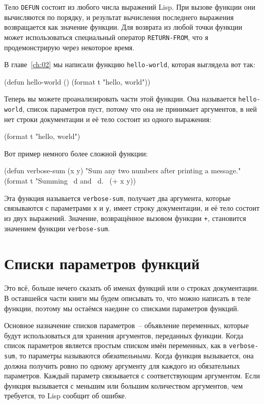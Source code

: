 Тело \lstinline{DEFUN} состоит из любого числа выражений Lisp.  При вызове функции они
вычисляются по порядку, и результат вычисления последнего выражения возвращается как
значение функции.  Для возврата из любой точки функции может использоваться специальный
оператор \lstinline{RETURN-FROM}, что я продемонстрирую через некоторое время.

В главе~\ref{ch:02} мы написали функцию \lstinline{hello-world}, которая выглядела вот так:

\begin{myverb}
(defun hello-world () (format t "hello, world"))
\end{myverb}

Теперь вы можете проанализировать части этой функции.  Она называется \lstinline{hello-world},
список параметров пуст, потому что она не принимает аргументов, в ней нет строки
документации и её тело состоит из одного выражения:

\begin{myverb}
(format t "hello, world")
\end{myverb}

Вот пример немного более сложной функции:

\begin{myverb}
(defun verbose-sum (x y)
  "Sum any two numbers after printing a message."
  (format t "Summing ~d and ~d.~%
  (+ x y))
\end{myverb}

Эта функция называется \lstinline{verbose-sum}, получает два аргумента, которые связываются с
параметрами \lstinline{x} и \lstinline{y}, имеет строку документации, и её тело состоит из двух
выражений.  Значение, возвращённое вызовом функции \lstinline{+}, становится значением функции
\lstinline{verbose-sum}.

\section{Списки параметров функций}

Это всё, больше нечего сказать об именах функций или о строках документации. В оставшейся
части книги мы будем описывать то, что можно написать в теле функции, поэтому мы остаёмся
наедине со списками параметров функций.

Основное назначение списков параметров~-- объявление переменных, которые будут
использоваться для хранения аргументов, переданных функции.  Когда список параметров
является простым списком имён переменных, как в \lstinline{verbose-sum}, то параметры
называются \textit{обязательными}.  Когда функция вызывается, она должна получить ровно по
одному аргументу для каждого из обязательных параметров.  Каждый параметр связывается с
соответствующим аргументом.  Если функция вызывается с меньшим или большим количеством
аргументов, чем требуется, то Lisp сообщит об ошибке.

